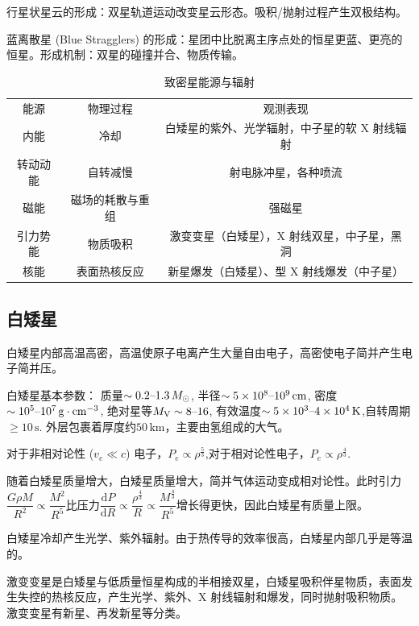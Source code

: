 \documentclass[../天体物理基础.tex]{subfiles}
\begin{document}
行星状星云的形成：双星轨道运动改变星云形态。吸积/抛射过程产生双极结构。

蓝离散星 (Blue Stragglers) 的形成：星团中比脱离主序点处的恒星更蓝、更亮的恒星。形成机制：双星的碰撞并合、物质传输。


\begin{table}[!htbp]
\centering
\caption{致密星能源与辐射}
\begin{tabular}{c c c}
\hline
能源 & 物理过程 & 观测表现\\
\cline{1-3}
内能 & 冷却 & 白矮星的紫外、光学辐射，中子星的软 X 射线辐射\\
\cline{1-3}
转动动能 & 自转减慢 & 射电脉冲星，各种喷流\\
\cline{1-3}
磁能 & 磁场的耗散与重组 & 强磁星\\
\cline{1-3}
引力势能 & 物质吸积 & 激变变星（白矮星），X 射线双星，中子星，黑洞\\
\cline{1-3}
核能 & 表面热核反应 & 新星爆发（白矮星）、\uppercase\expandafter{\romannumeral1}型 X 射线爆发（中子星）\\
\hline
\end{tabular}
\label{}
\end{table}


\subsection{白矮星}
白矮星内部高温高密，高温使原子电离产生大量自由电子，高密使电子简并产生电子简并压。

白矮星基本参数：
质量$\sim0.2\text{\textendash}1.3\,M_{\odot}$, 半径$\sim5\times10^{8}\text{\textendash}10^{9}\,\mathrm{cm}$, 密度$\sim10^{5}\text{\textendash}10^{7}\,\mathrm{g\cdot cm^{-3}}$, 绝对星等$M_{\text{V}}\sim8\text{\textendash}16$, 有效温度$\sim5\times10^{3}\text{\textendash}4\times10^{4}\,\mathrm{K}$,自转周期$\ge10\,\mathrm{s}$. 外层包裹着厚度约$50\,\mathrm{km}$，主要由氢组成的大气。

对于非相对论性 ($v_{e}\ll c$) 电子，$P_{e}\propto\rho^{\frac{5}{3}}$,对于相对论性电子，$P_{e}\propto\rho^{\frac{4}{3}}$.

随着白矮星质量增大，白矮星质量增大，简并气体运动变成相对论性。此时引力$\dfrac{G\rho{}M}{R^{2}}\propto{}\dfrac{M^{2}}{R^{5}}$比压力$\dfrac{\mathrm{d}P}{\mathrm{d}R}\propto{}\dfrac{\rho^{\frac{4}{3}}}{R}\propto{}\dfrac{M^{\frac{4}{3}}}{R^{5}}$增长得更快，因此白矮星有质量上限。

白矮星冷却产生光学、紫外辐射。由于热传导的效率很高，白矮星内部几乎是等温的。

激变变星是白矮星与低质量恒星构成的半相接双星，白矮星吸积伴星物质，表面发生失控的热核反应，产生光学、紫外、X 射线辐射和爆发，同时抛射吸积物质。激变变星有新星、再发新星等分类。
\end{document}
